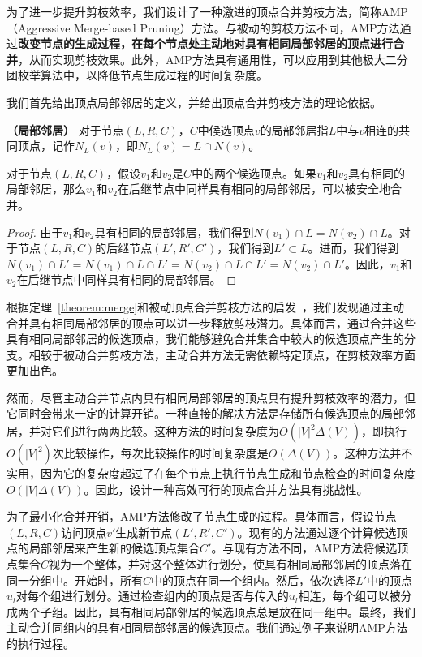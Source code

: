 为了进一步提升剪枝效率，我们设计了一种激进的顶点合并剪枝方法，简称AMP （Aggressive Merge-based Pruning）方法。与被动的剪枝方法不同，AMP方法通过\textbf{改变节点的生成过程，在每个节点处主动地对具有相同局部邻居的顶点进行合并}，从而实现剪枝效果。此外，AMP方法具有通用性，可以应用到其他极大二分团枚举算法中，以降低节点生成过程的时间复杂度。

我们首先给出顶点局部邻居的定义，并给出顶点合并剪枝方法的理论依据。

\begin{definition}
  \textbf{（局部邻居）} 对于节点$(L,R,C)$，$C$中候选顶点$v$的局部邻居指$L$中与$v$相连的共同顶点，记作$N_L(v)$，即$N_L(v) = L \cap N(v)$。
\end{definition}

\begin{theorem}
  对于节点$(L,R,C)$，假设$v_1$和$v_2$是$C$中的两个候选顶点。如果$v_1$和$v_2$具有相同的局部邻居，那么$v_1$和$v_2$在后继节点中同样具有相同的局部邻居，可以被安全地合并。
  \label{theorem:merge}
\end{theorem}

\begin{proof}
  由于$v_1$和$v_2$具有相同的局部邻居，我们得到$N(v_1)\cap L = N(v_2)\cap L$。对于节点$(L,R,C)$的后继节点$(L',R',C')$，我们得到$L' \subset L$。进而，我们得到$N(v_1)\cap L' = N(v_1) \cap L \cap L' = N(v_2) \cap L \cap L' = N(v_2)\cap L'$。因此，$v_1$和$v_2$在后继节点中同样具有相同的局部邻居。
\end{proof}


根据定理~\ref{theorem:merge}和被动顶点合并剪枝方法的启发~\cite{iMBEA14}，我们发现通过主动合并具有相同局部邻居的顶点可以进一步释放剪枝潜力。具体而言，通过合并这些具有相同局部邻居的候选顶点，我们能够避免合并集合中较大的候选顶点产生的分支。相较于被动合并剪枝方法，主动合并方法无需依赖特定顶点，在剪枝效率方面更加出色。

然而，尽管主动合并节点内具有相同局部邻居的顶点具有提升剪枝效率的潜力，但它同时会带来一定的计算开销。一种直接的解决方法是存储所有候选顶点的局部邻居，并对它们进行两两比较。这种方法的时间复杂度为$O(|V|^2\Delta(V))$，即执行$O(|V|^2)$次比较操作，每次比较操作的时间复杂度是$O(\Delta(V))$。这种方法并不实用，因为它的复杂度超过了在每个节点上执行节点生成和节点检查的时间复杂度$O(|V|\Delta(V))$。因此，设计一种高效可行的顶点合并方法具有挑战性。

为了最小化合并开销，AMP方法修改了节点生成的过程。具体而言，假设节点$(L,R,C)$访问顶点$v'$生成新节点$(L',R',C')$。现有的方法通过逐个计算候选顶点的局部邻居来产生新的候选顶点集合$C'$。与现有方法不同，AMP方法将候选顶点集合$C$视为一个整体，并对这个整体进行划分，使具有相同局部邻居的顶点落在同一分组中。开始时，所有$C$中的顶点在同一个组内。然后，依次选择$L'$中的顶点$u_l$对每个组进行划分。通过检查组内的顶点是否与传入的$u_l$相连，每个组可以被分成两个子组。因此，具有相同局部邻居的候选顶点总是放在同一组中。最终，我们主动合并同组内的具有相同局部邻居的候选顶点。我们通过例子来说明AMP方法的执行过程。


